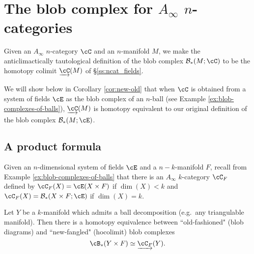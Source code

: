 
\section{The blob complex for \texorpdfstring{$A_\infty$}{A-infinity} \texorpdfstring{$n$}{n}-categories}
\label{sec:ainfblob}
Given an $A_\infty$ $n$-category $\cC$ and an $n$-manifold $M$, we make the 
anticlimactically tautological definition of the blob
complex $\bc_*(M;\cC)$ to be the homotopy colimit $\cl{\cC}(M)$ of \S\ref{ss:ncat_fields}.

We will show below 
in Corollary \ref{cor:new-old}
that when $\cC$ is obtained from a system of fields $\cE$ 
as the blob complex of an $n$-ball (see Example \ref{ex:blob-complexes-of-balls}), 
$\cl{\cC}(M)$ is homotopy equivalent to
our original definition of the blob complex $\bc_*(M;\cE)$.


%

\subsection{A product formula}
\label{ss:product-formula}


Given an $n$-dimensional system of fields $\cE$ and a $n{-}k$-manifold $F$, recall from 
Example \ref{ex:blob-complexes-of-balls} that there is an  $A_\infty$ $k$-category $\cC_F$ 
defined by $\cC_F(X) = \cE(X\times F)$ if $\dim(X) < k$ and
$\cC_F(X) = \bc_*(X\times F;\cE)$ if $\dim(X) = k$.


\begin{thm} \label{thm:product}
Let $Y$ be a $k$-manifold which admits a ball decomposition
(e.g.\ any triangulable manifold).
Then there is a homotopy equivalence between ``old-fashioned" (blob diagrams) 
and ``new-fangled" (hocolimit) blob complexes
\[
	\cB_*(Y \times F) \htpy \cl{\cC_F}(Y) .
\]\end{thm}

